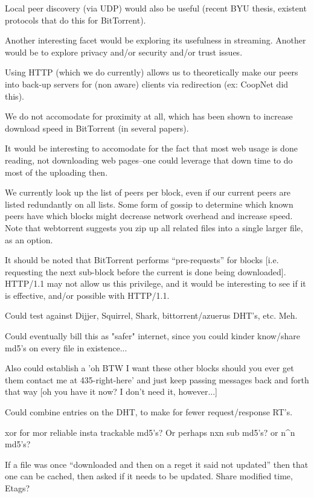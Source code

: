 Local peer discovery (via UDP) would also be useful (recent BYU thesis, existent protocols that do this for BitTorrent).

Another interesting facet would be exploring its usefulness in streaming.  Another would be to explore privacy and/or security and/or trust issues.

Using HTTP (which we do currently) allows us to theoretically make our peers into back-up servers for (non aware) clients via redirection (ex: CoopNet did this).

We do not accomodate for proximity at all, which has been shown to increase download speed in BitTorrent (in several papers).

It would be interesting to accomodate for the fact that most web usage is done reading, not downloading web pages--one could leverage that down time to do most of the uploading then.

We currently look up the list of peers per block, even if our current peers are listed redundantly on all lists.  Some form of gossip to determine which known peers have which blocks might decrease network overhead and increase speed.  Note that webtorrent suggests you zip up all related files into a single larger file, as an option.

It should be noted that BitTorrent performs ``pre-requests'' for blocks [i.e. requesting the next sub-block before the current is done being downloaded].   HTTP/1.1 may not allow us this privilege, and it would be interesting to see if it is effective, and/or possible with HTTP/1.1.

Could test against Dijjer, Squirrel, Shark,  bittorrent/azuerus DHT's, etc. Meh.

Could eventually bill this as "safer" internet, since you could kinder know/share md5's on every file in existence...

Also could establish a 'oh BTW I want these other blocks should you
ever get them contact me at 435-right-here' and just keep passing
messages back and forth that way [oh you have it now? I don't need it,
however...]

Could combine entries on the DHT, to make for fewer request/response RT's.

xor for mor reliable insta trackable md5's? Or perhaps nxn sub md5's? or n^n md5's?

If a file was once ``downloaded and then on a reget it said not updated'' then that one can be cached, then asked if it needs to be updated.  Share modified time, Etags?

